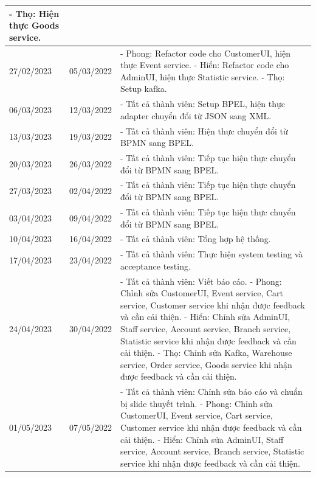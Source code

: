 {\begin{longtable}{| p{2cm} | p{2cm} | p{10cm} |}
    \newline
    - Thọ: Hiện thực Goods service. \\
	\hline
	27/02/2023 & 05/03/2022 & 
    - Phong: Refactor code cho CustomerUI, hiện thực Event service. 
    \newline
    - Hiển: Refactor code cho AdminUI, hiện thực Statistic service. 
    \newline
    - Thọ: Setup kafka. \\
	\hline
	06/03/2023 & 12/03/2022 & 
    - Tất cả thành viên: Setup BPEL, hiện thực adapter chuyển đổi từ JSON sang XML. \\
	\hline
	13/03/2023 & 19/03/2022 & 
    - Tất cả thành viên: Hiện thực chuyển đổi từ BPMN sang BPEL. \\
	\hline
	20/03/2023 & 26/03/2022 & 
    - Tất cả thành viên: Tiếp tục hiện thực chuyển đổi từ BPMN sang BPEL. \\
	\hline
	27/03/2023 & 02/04/2022 & 
    - Tất cả thành viên: Tiếp tục hiện thực chuyển đổi từ BPMN sang BPEL. \\
	\hline
	03/04/2023 & 09/04/2022 & 
    - Tất cả thành viên: Tiếp tục hiện thực chuyển đổi từ BPMN sang BPEL. \\
	\hline
	10/04/2023 & 16/04/2022 & 
    - Tất cả thành viên: Tổng hợp hệ thống. \\
	\hline
	17/04/2023 & 23/04/2022 & 
    - Tất cả thành viên: Thực hiện system testing và acceptance testing. \\
	\hline
	24/04/2023 & 30/04/2022 & 
    - Tất cả thành viên: Viết báo cáo.
    \newline
    - Phong: Chỉnh sửa CustomerUI, Event service, Cart service, Customer service khi nhận được feedback và cần cải thiện. 
    \newline
    - Hiển: Chỉnh sửa AdminUI, Staff service, Account service, Branch service, Statistic service khi nhận được feedback và cần cải thiện. 
    \newline
    - Thọ: Chỉnh sửa Kafka, Warehouse service, Order service, Goods service khi nhận được feedback và cần cải thiện. \\
	\hline
	01/05/2023 & 07/05/2022 & 
    - Tất cả thành viên: Chỉnh sửa báo cáo và chuẩn bị slide thuyết trình.
    \newline
    - Phong: Chỉnh sửa CustomerUI, Event service, Cart service, Customer service khi nhận được feedback và cần cải thiện. 
    \newline
    - Hiển: Chỉnh sửa AdminUI, Staff service, Account service, Branch service, Statistic service khi nhận được feedback và cần cải thiện. 

\end{longtable}}
